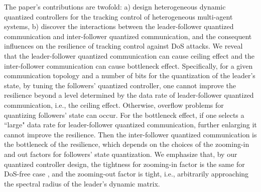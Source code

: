 \documentclass{autart}
\begin{document}
The paper's contributions are twofold: a) design heterogeneous dynamic quantized controllers for the tracking control of heterogeneous multi-agent systems, b) discover the interactions between the leader-follower quantized communication and inter-follower quantized communication, and the consequent influences on the resilience of tracking control against DoS attacks. 
We reveal that 
the leader-follower quantized communication can cause ceiling effect and the inter-follower communication can cause bottleneck effect. Specifically, for a given communication topology and a number of bits for the quantization of the leader's state, by tuning the followers' quantized controller, one cannot improve the resilience beyond a level determined by the data rate of leader-follower quantized communication, i.e., the ceiling effect. Otherwise, overflow problems for quantizing followers' state can occur.   
For the bottleneck effect, if one selects a ``large" data rate for leader-follower quantized communication, further enlarging it cannot improve the resilience. Then the inter-follower quantized communication is the bottleneck of the resilience, which depends on the choices of the zooming-in and out factors for followers' state quantization. We emphasize that, by our quantized controller design,  the tightness for zooming-in factor is the same for DoS-free case \cite{you2011network}, and the zooming-out factor is tight, i.e., arbitrarily approaching the spectral radius of the leader's dynamic matrix. 



\end{document}

